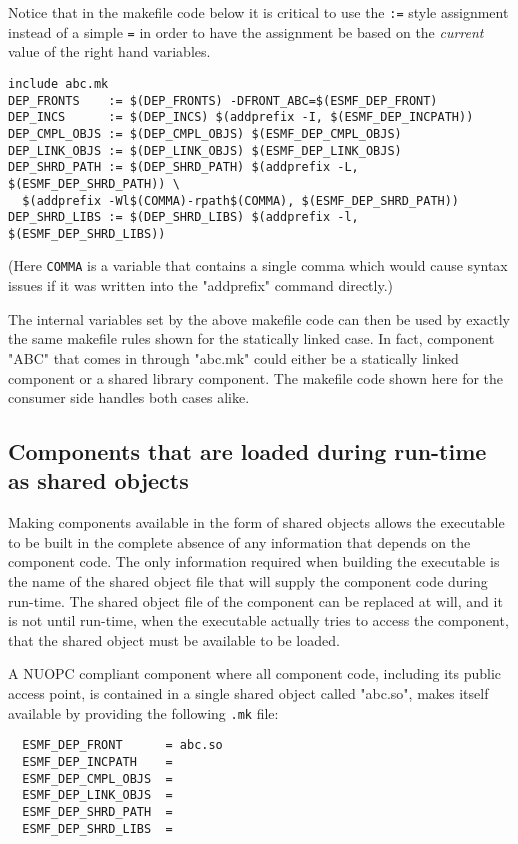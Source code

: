 Notice that in the makefile code below it is critical to use the {\tt :=} style assignment instead of a simple {\tt =} in order to have the assignment be based on the {\em current} value of the right hand variables.

\begin{verbatim}
include abc.mk
DEP_FRONTS    := $(DEP_FRONTS) -DFRONT_ABC=$(ESMF_DEP_FRONT)
DEP_INCS      := $(DEP_INCS) $(addprefix -I, $(ESMF_DEP_INCPATH))
DEP_CMPL_OBJS := $(DEP_CMPL_OBJS) $(ESMF_DEP_CMPL_OBJS)
DEP_LINK_OBJS := $(DEP_LINK_OBJS) $(ESMF_DEP_LINK_OBJS)
DEP_SHRD_PATH := $(DEP_SHRD_PATH) $(addprefix -L, $(ESMF_DEP_SHRD_PATH)) \
  $(addprefix -Wl$(COMMA)-rpath$(COMMA), $(ESMF_DEP_SHRD_PATH))
DEP_SHRD_LIBS := $(DEP_SHRD_LIBS) $(addprefix -l, $(ESMF_DEP_SHRD_LIBS))
\end{verbatim}

(Here {\tt COMMA} is a variable that contains a single comma which would cause syntax issues if it was written into the "addprefix" command directly.)

The internal variables set by the above makefile code can then be used by exactly the same makefile rules shown for the statically linked case. In fact, component "ABC" that comes in through "abc.mk" could either be a statically linked component or a shared library component. The makefile code shown here for the consumer side handles both cases alike.

\subsection{Components that are loaded during run-time as shared objects}
\label{StandardCompDep:SharedObject}

Making components available in the form of shared objects allows the executable to be built in the complete absence of any information that depends on the component code. The only information required when building the executable is the name of the shared object file that will supply the component code during run-time. The shared object file of the component can be replaced at will, and it is not until run-time, when the executable actually tries to access the component, that the shared object must be available to be loaded.

A NUOPC compliant component where all component code, including its public access point, is contained in a single shared object called "abc.so", makes itself available by providing the following {\tt .mk} file:

\begin{verbatim}
  ESMF_DEP_FRONT      = abc.so
  ESMF_DEP_INCPATH    = 
  ESMF_DEP_CMPL_OBJS  = 
  ESMF_DEP_LINK_OBJS  = 
  ESMF_DEP_SHRD_PATH  = 
  ESMF_DEP_SHRD_LIBS  = 
\end{verbatim}

